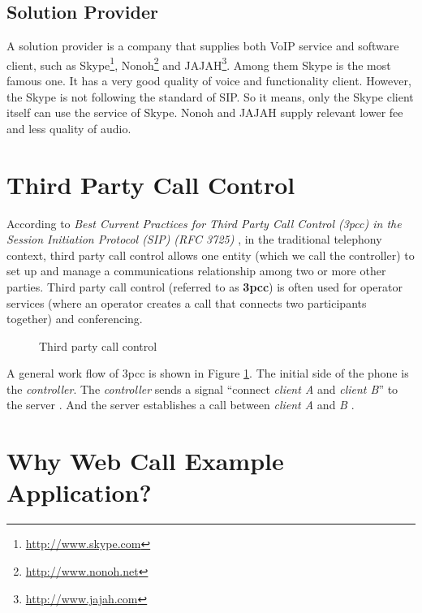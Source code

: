 \subsection{Solution Provider}
\label{sec:BackgroundStudy:VoIPMarket:SolutionProvider}

A solution provider is a company that supplies both VoIP service and software client, such as \textsf{Skype}\texttrademark{}\footnote{\url{http://www.skype.com}}, \textsf{Nonoh}\footnote{\url{http://www.nonoh.net}} and JAJAH\footnote{\url{http://www.jajah.com}}.  Among them \textsf{Skype} is the most famous one. It has a very good quality of voice and functionality client. However, the \textsf{Skype} is not following the standard of SIP. So it means, only the \textsf{Skype} client itself can use the service of \textsf{Skype}. \textsf{Nonoh} and \textsf{JAJAH} supply relevant lower fee and less quality of audio.


\section{Third Party Call Control}
\label{sec:BackgroundStudy:ThirdPartyCallControl}

According to \textit{Best Current Practices for Third Party Call Control (3pcc) in the Session Initiation Protocol (SIP) (RFC 3725)} \cite{RFC3725}, in the traditional telephony context, third party call control allows one entity (which we call the controller) to set up and manage a communications relationship among two or more other parties.  Third party call control (referred to as \textbf{3pcc}\label{sym:3pcc}) is often used for operator services (where an operator creates a call that connects two participants together) and conferencing.

\begin{figure}[!hbtp]
\centering
{}
\caption{Third party call control}
\label{fig:ThirdPartyCallControl}
\end{figure}

A general work flow of 3pcc is shown in Figure \ref{fig:ThirdPartyCallControl}. The initial side of the phone is the \textit{controller}. The \textit{controller} sends a signal ``connect \textit{client \nolinebreak A} and \textit{client \nolinebreak B}'' to the server \hyperref[fig:ThirdPartyCallControl]{}. And the server establishes a call between \textit{client A} and \textit{B} \hyperref[fig:ThirdPartyCallControl]{}.


\section{Why Web Call Example Application?}
\label{sec:BackgroundStudy:WhyWebCallExampleApplication}

